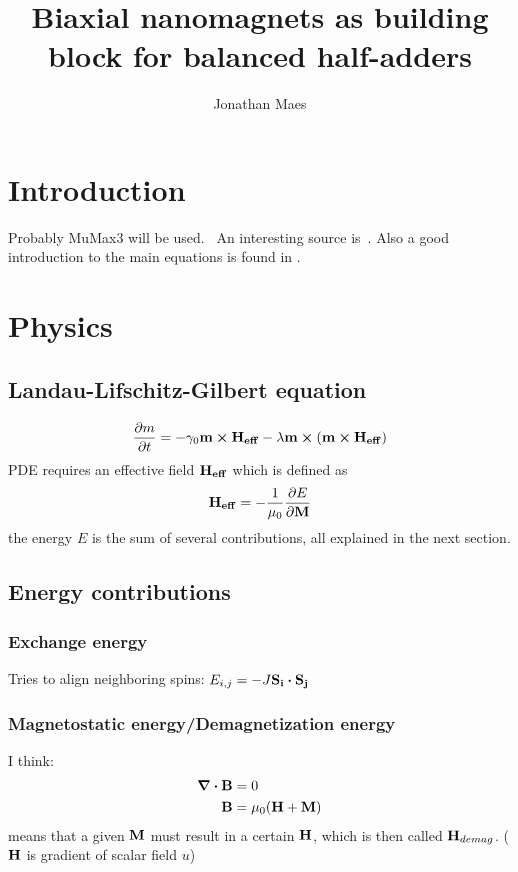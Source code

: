\documentclass[10pt,a4paper]{article}
\author{Jonathan Maes}
\title{Biaxial nanomagnets as building block for balanced half-adders}
\begin{document}
	\begin{titlingpage}
	\maketitle
	\end{titlingpage}

	\newpage
	
	\tableofcontents
	\newpage

	\section{Introduction}
	Probably MuMax3 will be used.~\cite{MuMax3}
	An interesting source is~\cite{NML_Carlton}.
	Also a good introduction to the main equations is found in \cite{MuMax3_advances}.
	
	\section{Physics}
	\subsection{Landau-Lifschitz-Gilbert equation}
	\begin{equation}
		\frac{\partial m}{\partial t} = - \gamma_0 \vb{m} \cross \vb{H_{eff}} - \lambda \vb{m} \cross (\vb{m} \cross \vb{H_{eff}})
	\end{equation}
	PDE requires an effective field $\vb{H_{eff}}$ which is defined as
	\begin{equation}
		\vb{H_{eff}} = - \frac{1}{\mu_0} \frac{\partial E}{\partial \vb{M}}
	\end{equation}
	the energy $E$ is the sum of several contributions, all explained in the next section.
	
	\subsection{Energy contributions}
	\subsubsection{Exchange energy}
	Tries to align neighboring spins:
	$E_{i,j} = -J \vb{S_i} \vdot \vb{S_j}$
	\subsubsection{Magnetostatic energy/Demagnetization energy}
	I think:
	\begin{align}
		\div{\vb{B}} &= 0 \\
		\vb{B} &= \mu_0 (\vb{H} + \vb{M})
	\end{align}
	means that a given $\vb{M}$ must result in a certain $\vb{H}$, which is then called $\vb{H}_{demag}$.
	($\vb{H}$ is gradient of scalar field $u$)
	
\end{document}

